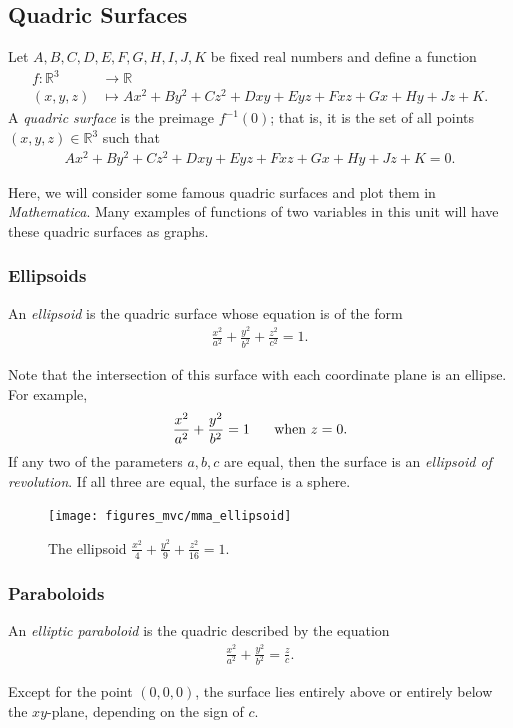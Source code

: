 \documentclass[12pt,letterpaper,reqno]{article}
\numberwithin{equation}{section}
\newcommand{\R}{\ensuremath{\mathbb R}}
\begin{document}
{\subsection{Quadric Surfaces}
\begin{defn}
	Let $A,B,C,D,E,F,G,H,I,J,K$ be fixed real numbers and define a function
	\begin{align*}
		f:\R^3 &\to \R  \\
		(x,y,z)&\mapsto Ax^2+By^2+Cz^2+Dxy+Eyz+Fxz+Gx+Hy+Jz+K.
	\end{align*}
	A \emph{quadric surface} is the preimage $f^{-1}(0)$; that is, it is the set of all points $(x,y,z) \in \R^3$ such that 
	\begin{align*}
		Ax^2+By^2+Cz^2+Dxy+Eyz+Fxz+Gx+Hy+Jz+K=0.
	\end{align*}
\end{defn}
Here, we will consider some famous quadric surfaces and plot them in \emph{Mathematica}. Many examples of functions of two variables in this unit will have these quadric surfaces as graphs.

\subsubsection{Ellipsoids}
\begin{defn}[Ellipsoid]
	An \emph{ellipsoid} is the quadric surface whose equation is of the form
	\begin{align*}
		\frac{x^2}{a^2}+\frac{y^2}{b^2}+\frac{z^2}{c^2}=1.
	\end{align*}
\end{defn}
Note that the intersection of this surface with each coordinate plane is an ellipse. For example,
\begin{align*}
	\frac{x^2}{a^2}+\frac{y^2}{b^2}=1 \hspace{0.5cm} \text{ when } z=0.
\end{align*}
If any two of the parameters $a,b,c$ are equal, then the surface is an \emph{ellipsoid of revolution}. If all three are equal, the surface is a sphere.
\begin{figure}[h]
	\begin{center}
		\texttt{[image: figures\_mvc/mma\_ellipsoid]}
	\end{center}
	\caption{The ellipsoid $\frac{x^2}{4}+\frac{y^2}{9}+\frac{z^2}{16}=1$.}
\end{figure}

\subsubsection{Paraboloids}
\begin{defn}
	An \emph{elliptic paraboloid} is the quadric described by the equation
	\begin{align*}
		\frac{x^2}{a^2}+\frac{y^2}{b^2}=\frac{z}{c}.
	\end{align*}
\end{defn}
Except for the point $(0,0,0)$, the surface lies entirely above or entirely below the $xy$-plane, depending on the sign of $c$.

}
\end{document}
